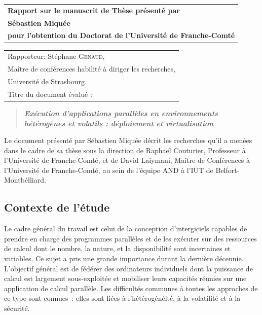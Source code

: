 \documentclass[a4paper,12pt]{article}
\begin{document}
\begin{flushleft}
\begin{tabular}[t]{l}
\Large\textsf{\textbf{Rapport sur le manuscrit de Thèse présenté par}}\\[4mm]
\Large\textsf{\textbf{Sébastien Miquée}}\\[4mm]
\large\textsf{\textbf{pour l'obtention du Doctorat de l'Université de Franche-Comté}}\\
\end{tabular}%


\noindent%
\begin{tabular}[t]{l}
Rapporteur: Stéphane \textsc{Genaud},\\
Maître de conférences habilité à diriger les recherches,\\
Université de Strasbourg.\\[3mm]
Titre du document évalué :\\[1mm]
\end{tabular}%

\begin{quote}
\Large \textit{\textsf{\textbf{
Exécution d'applications parallèles en environnements hétérogènes et volatils : déploiement et virtualisation%
}}}
\end{quote}

\end{flushleft}

\vspace{6mm}

Le document présenté par Sébastien Miquée décrit les recherches qu'il a menées dans
le cadre de sa thèse sous la direction de Raphaël Couturier, Professeur à l'Université 
de Franche-Comté, et de David Laiymani, Maître de Conférences à l'Université                  
de Franche-Comté, au sein de l'équipe AND à l'IUT de Belfort-Montbélliard.


\subsection*{Contexte de l'étude}
\vspace{-3mm}
Le cadre général du travail est celui de la conception d'intergiciels
capables de prendre en charge des programmes parallèles et de les
exécuter sur des ressources de calcul dont le nombre, la nature, et
la disponibilité sont incertaines et variables. Ce sujet a pris une 
grande importance durant la dernière décennie. L'objectif général
est de fédérer des ordinateurs individuels dont la puissance de calcul
est largement sous-exploitée et mobiliser leurs capacités réunies
sur une application de calcul parallèle. Les difficultés communes à
toutes les approches de ce type sont connues~: elles sont liées à 
l'hétérogénéité, à la volatilité et à la sécurité. 
\end{document}
